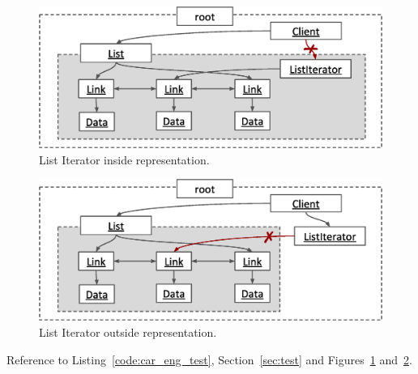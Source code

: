\documentclass{acm_proc_article-sp}
\begin{document}
\begin{figure}[t]
\centering
\includegraphics{iterator-fail-inside.eps}
\caption{List Iterator inside representation.}
\label{fig:iterator-inside-test}
\end{figure}

\begin{figure}[t]
\centering
\includegraphics{iterator-fail-outside.eps}
\caption{List Iterator outside representation.}
\label{fig:iterator-outside-test}
\end{figure}

Reference to Listing~\ref{code:car_eng_test}, Section~\ref{sec:test} and Figures~\ref{fig:iterator-inside-test} and~\ref{fig:iterator-outside-test}.
\end{document}
